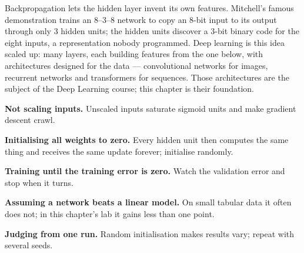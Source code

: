 \begin{conceptbox}
Backpropagation lets the hidden layer invent its own features. Mitchell's famous
demonstration trains an 8--3--8 network to copy an 8-bit input to its output
through only 3 hidden units; the hidden units discover a 3-bit binary code for the
eight inputs, a representation nobody programmed. Deep learning is this idea
scaled up: many layers, each building features from the one below, with
architectures designed for the data --- convolutional networks for images,
recurrent networks and transformers for sequences. Those architectures are the
subject of the Deep Learning course; this chapter is their foundation.
\end{conceptbox}

\begin{pitfall}
\begin{tight}
  \item \textbf{Not scaling inputs.} Unscaled inputs saturate sigmoid units and
        make gradient descent crawl.
  \item \textbf{Initialising all weights to zero.} Every hidden unit then computes
        the same thing and receives the same update forever; initialise randomly.
  \item \textbf{Training until the training error is zero.} Watch the validation
        error and stop when it turns.
  \item \textbf{Assuming a network beats a linear model.} On small tabular data it
        often does not; in this chapter's lab it gains less than one point.
  \item \textbf{Judging from one run.} Random initialisation makes results vary;
        repeat with several seeds.
\end{tight}
\end{pitfall}

